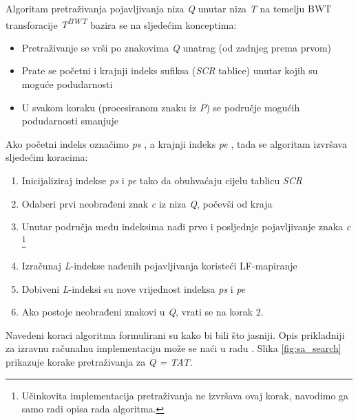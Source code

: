 \documentclass[times, utf8, seminar, numeric]{fer}
\begin{document}
Algoritam pretraživanja pojavljivanja niza \textit{Q} unutar niza \textit{T} na temelju
BWT transforacije \textit{T\textsuperscript{BWT}} bazira se na sljedećim konceptima:

\begin{itemize}
  \item{Pretraživanje se vrši po znakovima \textit{Q} unatrag (od zadnjeg prema prvom)}
  \item{Prate se početni i krajnji indeks sufiksa (\textit{SCR} tablice) unutar kojih su moguće podudarnosti}
  \item{U svakom koraku (procesiranom znaku iz \textit{P}) se područje mogućih podudarnosti smanjuje}
\end{itemize}

Ako početni indeks označimo \textit{ps} , a krajnji indeks \textit{pe}
, tada se algoritam izvršava sljedećim koracima:

\begin{enumerate}
  \item{Inicijaliziraj indekse \textit{ps} i \textit{pe} tako da obuhvaćaju cijelu tablicu \textit{SCR}}
  \item{Odaberi prvi neobrađeni znak \textit{c} iz niza \textit{Q}, počevši od kraja}
  \item{Unutar područja među indeksima nađi prvo i posljednje pojavljivanje znaka \textit{c}
    \footnote{Učinkovita implementacija pretraživanja ne izvršava ovaj korak, navodimo ga
    samo radi opisa rada algoritma.}}
  \item{Izračunaj \textit{L}-indekse nađenih pojavljivanja koristeći LF-mapiranje}
  \item{Dobiveni \textit{L}-indeksi su nove vrijednost indeksa \textit{ps} i \textit{pe}}
  \item{Ako postoje neobrađeni znakovi u \textit{Q}, vrati se na korak 2.}
\end{enumerate}

Navedeni koraci algoritma formulirani su kako bi bili što jasniji. Opis prikladniji
za izravnu računalnu implementaciju može se naći u radu \cite{singer_2012}. Slika
\ref{fig:sa_search} prikazuje korake pretraživanja za \textit{Q = TAT}.
\end{document}

